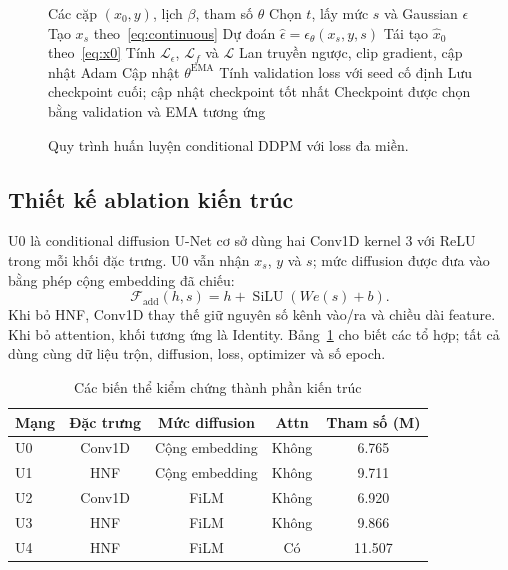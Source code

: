 \documentclass[conference]{IEEEtran}
\DeclareMathOperator{\SiLU}{SiLU}
\begin{document}
\begin{figure}[t]
 \centering
 \begin{minipage}{\linewidth}
 \small
 \begin{algorithmic}[1]
 \REQUIRE Các cặp $(x_0,y)$, lịch $\beta$, tham số $\theta$
     \STATE Chọn $t$, lấy mức $s$ và Gaussian $\epsilon$
     \STATE Tạo $x_s$ theo~\eqref{eq:continuous}
     \STATE Dự đoán $\hat\epsilon=\epsilon_\theta(x_s,y,s)$
     \STATE Tái tạo $\hat x_0$ theo~\eqref{eq:x0}
     \STATE Tính $\mathcal{L}_{\epsilon}$, $\mathcal{L}_f$ và $\mathcal{L}$
     \STATE Lan truyền ngược, clip gradient, cập nhật Adam
     \STATE Cập nhật $\theta^{\mathrm{EMA}}$
   \ENDFOR
   \STATE Tính validation loss với seed cố định
   \STATE Lưu checkpoint cuối; cập nhật checkpoint tốt nhất
 \ENDFOR
 \ENSURE Checkpoint được chọn bằng validation và EMA tương ứng
 \end{algorithmic}
 \end{minipage}
 \caption{Quy trình huấn luyện conditional DDPM với loss đa miền.}
 \label{fig:algorithm}
\end{figure}

\subsection{Thiết kế ablation kiến trúc}
U0 là conditional diffusion U-Net cơ sở dùng hai Conv1D kernel 3 với ReLU trong mỗi khối đặc trưng. U0 vẫn nhận $x_s$, $y$ và $s$; mức diffusion được đưa vào bằng phép cộng embedding đã chiếu:
\begin{equation}
 \mathcal{F}_{\mathrm{add}}(h,s)=h+\SiLU(W e(s)+b).
\end{equation}
Khi bỏ HNF, Conv1D thay thế giữ nguyên số kênh vào/ra và chiều dài feature. Khi bỏ attention, khối tương ứng là Identity. Bảng~\ref{tab:ablation} cho biết các tổ hợp; tất cả dùng cùng dữ liệu trộn, diffusion, loss, optimizer và số epoch.

\begin{table}[t]
 \caption{Các biến thể kiểm chứng thành phần kiến trúc}
 \label{tab:ablation}
 \centering\small
 \begin{tabular}{@{}lcccc@{}}
 \toprule
 Mạng & Đặc trưng & Mức diffusion & Attn & Tham số (M)\\
 \midrule
 U0 & Conv1D & Cộng embedding & Không & 6.765\\
 U1 & HNF & Cộng embedding & Không & 9.711\\
 U2 & Conv1D & FiLM & Không & 6.920\\
 U3 & HNF & FiLM & Không & 9.866\\
 U4 & HNF & FiLM & Có & 11.507\\
 \bottomrule
 \end{tabular}
\end{table}
\end{document}
